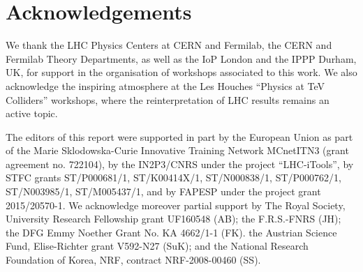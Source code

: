 \documentclass[a4paper,aps,prd,longbibliography,notitlepage,showpacs,amsmath,amssymb,superscriptaddress,nofootinbib,floatfix,11pt,preprintnumbers]{revtex4-1-mod}
\begin{document}
\section*{Acknowledgements}
We thank the LHC Physics Centers at CERN and Fermilab, the CERN and Fermilab Theory Departments, as well as
the IoP London and the IPPP Durham, UK, for support in the organisation of workshops associated to this work.
We also acknowledge the inspiring atmosphere at the Les Houches ``Physics at TeV Colliders'' workshops, where the reinterpretation of LHC results remains an active topic.

The editors of this report were supported in part by the European Union as part of the Marie Sklodowska-Curie Innovative Training Network MCnetITN3 (grant agreement no. 722104), by the IN2P3/CNRS under the project ``LHC-iTools'', by STFC grants ST/P000681/1, ST/K00414X/1, ST/N000838/1, ST/P000762/1, ST/N003985/1, ST/M005437/1, and by FAPESP under the project grant 2015/20570-1.
We acknowledge moreover partial support by
The Royal Society, University Research Fellowship grant UF160548 (AB); the F.R.S.-FNRS (JH); the DFG Emmy Noether Grant No. KA 4662/1-1 (FK).
the Austrian Science Fund, Elise-Richter grant V592-N27 (SuK);
and the National Research Foundation of Korea, NRF, contract NRF-2008-00460 (SS).



\end{document}
